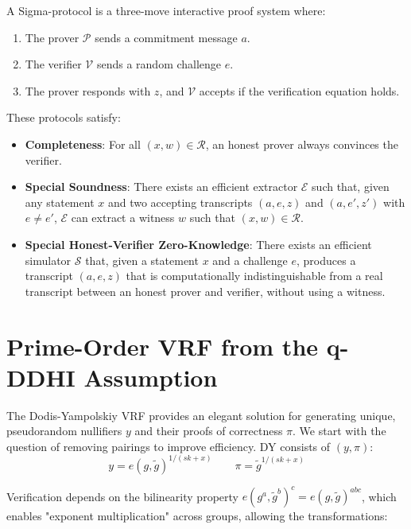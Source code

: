 A Sigma-protocol is a three-move interactive proof system where:
\begin{enumerate}
    \item The prover $\mathcal{P}$ sends a commitment message $a$.
    \item The verifier $\mathcal{V}$ sends a random challenge $e$.
    \item The prover responds with $z$, and $\mathcal{V}$ accepts if the verification equation holds.
\end{enumerate}
These protocols satisfy:
\begin{itemize}
    \item \textbf{Completeness}: For all $(x,w) \in \mathcal{R}$, an honest prover always convinces the verifier.
    \item \textbf{Special Soundness}: There exists an efficient extractor $\mathcal{E}$ such that, given any statement $x$ and two accepting transcripts $(a,e,z)$ and $(a,e',z')$ with $e \neq e'$, $\mathcal{E}$ can extract a witness $w$ such that $(x,w) \in \mathcal{R}$.
    \item \textbf{Special Honest-Verifier Zero-Knowledge}: There exists an efficient simulator $\mathcal{S}$ that, given a statement $x$ and a challenge $e$, produces a transcript $(a,e,z)$ that is computationally indistinguishable from a real transcript between an honest prover and verifier, without using a witness.
\end{itemize}












\section{Prime-Order VRF from the q-DDHI Assumption}\label{sec:vrf-prime-order}

The Dodis-Yampolskiy \cite{hutchison_verifiable_2005} VRF provides an elegant solution for generating unique, pseudorandom nullifiers $y$ and their proofs of correctness $\pi$. We start with the question of removing pairings to improve efficiency. DY consists of $(y, \pi)$:
\[
y = e(g, \tilde{g})^{1/(sk+x)} \qquad \pi = \tilde{g}^{1/(sk+x)}
\]

Verification depends on the bilinearity property $e(g^a, \tilde{g}^b)^c = e(g, \tilde{g})^{abc}$, which enables "exponent multiplication" across groups, allowing the transformations:

